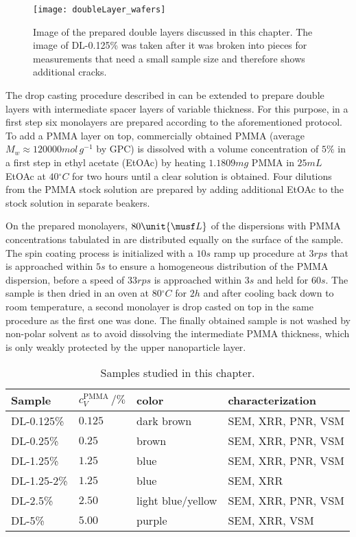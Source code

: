 \documentclass[\main/dresen_thesis.tex]{subfiles}
\begin{document}
  \begin{figure}[tb]
    \centering
    \texttt{[image: doubleLayer\_wafers]}
    \caption{\label{fig:doubleLayers:preparation:waferImage}Image of the prepared double layers discussed in this chapter. The image of DL-0.125\% was taken after it was broken into pieces for measurements that need a small sample size and therefore shows additional cracks.}
  \end{figure}

  The drop casting procedure described in  can be extended to prepare double layers with intermediate spacer layers of variable thickness.
  For this purpose, in a first step six monolayers are prepared according to the aforementioned protocol.
  To add a PMMA layer on top, commercially obtained PMMA (average $M_w \approx 120000 \unit{mol \, g^{-1}}$ by GPC) is dissolved with a volume concentration of $5 \%$ in a first step in ethyl acetate (EtOAc) by heating $1.1809 \unit{mg}$ PMMA in $25 \unit{mL}$ EtOAc at $40 \unit{^\circ C}$ for two hours until a clear solution is obtained.
  Four dilutions from the PMMA stock solution are prepared by adding additional EtOAc to the stock solution in separate beakers.

  On the prepared monolayers, $80 \unit{\musf L}$ of the dispersions with PMMA concentrations tabulated in  are distributed equally on the surface of the sample.
  The spin coating process is initialized with a $10 \unit{s}$ ramp up procedure at $3 \unit{rps}$ that is approached within $5s$ to ensure a homogeneous distribution of the PMMA dispersion, before a speed of $33 \unit{rps}$ is approached within $3 \unit{s}$ and held for $60 \unit{s}$.
  The sample is then dried in an oven at $80 \unit{^\circ C}$ for $2 \unit{h}$ and after cooling back down to room temperature, a second monolayer is drop casted on top in the same procedure as the first one was done.
  The finally obtained sample is not washed by non-polar solvent as to avoid dissolving the intermediate PMMA thickness, which is only weakly protected by the upper nanoparticle layer.

  \begin{table}[!htbp]
    \centering
    \caption{\label{tab:doubleLayers:preparation:samples}Samples studied in this chapter.}
    \begin{tabular}{ l | l | l | l}
      \textbf{Sample}  & $c_V^\mathrm{PMMA} \, / \unit{\%} $ & color & characterization\\
      \hline
      DL-0.125\%    & $0.125$ & dark brown      & SEM, XRR, PNR, VSM\\
      DL-0.25\%     & $0.25$ & brown            & SEM, XRR, PNR, VSM\\
      DL-1.25\%     & $1.25$ & blue             & SEM, XRR, PNR, VSM\\
      DL-1.25-2\%   & $1.25$ & blue             & SEM, XRR\\
      DL-2.5\%      & $2.50$ & light blue/yellow& SEM, XRR, PNR, VSM\\
      DL-5\%        & $5.00$ & purple           & SEM, XRR, VSM\\
      \hline
    \end{tabular}
  \end{table}
\end{document}
